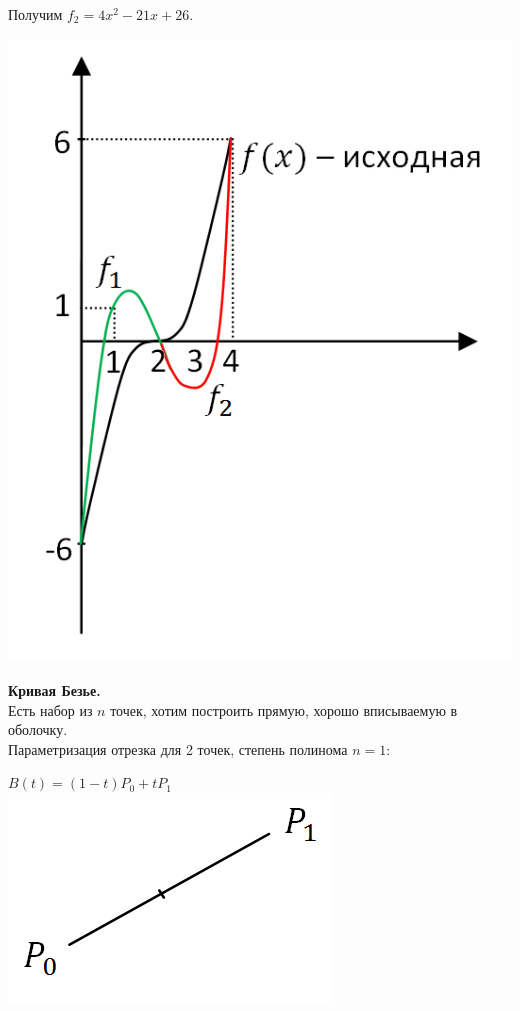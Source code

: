 \documentclass[12pt]{article}
\theoremstyle{definition}
\numberwithin{equation}{section}
\begin{document}
Получим $f_2 = 4x^2-21x+26$.\begin{center}
\includegraphics[scale=0.7]{l3_6.png}\end{center}
\noindent \textbf{Кривая Безье.}\\
Есть набор из $n$ точек, хотим построить прямую, хорошо вписываемую в оболочку.\\
Параметризация отрезка для 2 точек, степень полинома $n = 1$:
\begin{center}
$B(t) = (1-t)P_0+tP_1$\\
\includegraphics[scale=0.5]{l3_7.png}\end{center}
\end{document}
